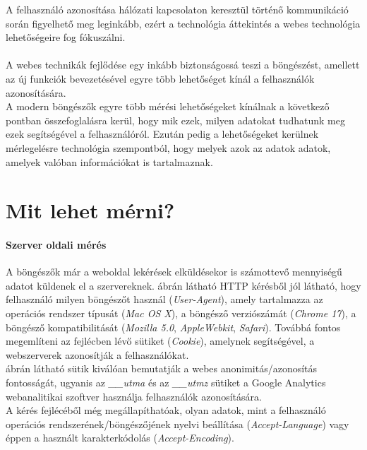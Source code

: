 
A felhasználó azonosítása hálózati kapcsolaton keresztül történő kommunikáció során figyelhető meg leginkább, ezért a technológia áttekintés a webes technológia lehetőségeire fog fókuszálni.\\
\\
A webes technikák fejlődése egy inkább biztonságossá teszi a böngészést, amellett az új funkciók bevezetésével egyre több lehetőséget kínál a felhasználók azonosítására.\\
A modern böngészők egyre több mérési lehetőségeket kínálnak a következő pontban összefoglalásra kerül, hogy mik ezek, milyen adatokat tudhatunk meg ezek segítségével a felhasználóról. Ezután pedig a lehetőségeket kerülnek mérlegelésre technológia szempontból, hogy melyek azok az adatok adatok, amelyek valóban információkat is tartalmaznak.

\section{Mit lehet mérni?} %
\label{sec:miket_lehet_merni_}

\paragraph{Szerver oldali mérés} %
\label{par:szerver_oldali_meres}

A böngészők már a weboldal lekérések elküldésekor is számottevő mennyiségű adatot küldenek el a szervereknek.  ábrán látható HTTP kérésből jól látható, hogy felhasználó milyen böngészőt használ (\textit{User-Agent}), amely tartalmazza az operációs rendszer típusát (\textit{Mac OS X}), a böngésző verziószámát (\textit{Chrome 17}), a böngésző kompatibilitását (\textit{Mozilla 5.0}, \textit{AppleWebkit}, \textit{Safari}). Továbbá fontos megemlíteni az fejlécben lévő sütiket (\textit{Cookie}), amelynek segítségével, a webszerverek azonosítják a felhasználókat.\\
 ábrán látható sütik kiválóan bemutatják a webes anonimitás/azonosítás fontosságát, ugyanis az \textit{\_\_utma} és az \textit{\_\_utmz} sütiket a Google Analytics webanalitikai szoftver használja felhasználók azonosítására.\\
A kérés fejlécéből még megállapíthatóak, olyan adatok, mint a felhasználó operációs rendszerének/böngészőjének nyelvi beállítása (\textit{Accept-Language}) vagy éppen a használt karakterkódolás (\textit{Accept-Encoding}).\\
\clearpage

